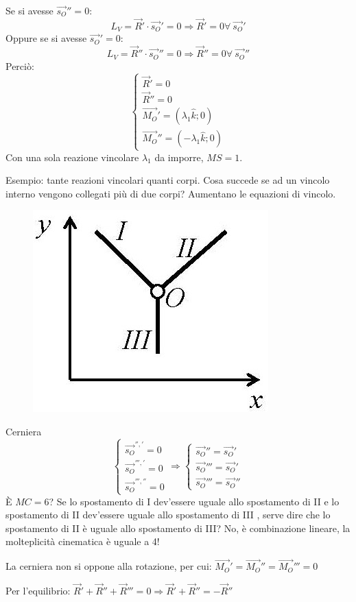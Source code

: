 \documentclass{article}
\begin{document}
\begin{adjustwidth}{2in}{}
\begin{enumerate}
Se si avesse $\vec{s_O}'' = 0$:
\[
L_{V} = \vec{R}' \cdot \vec{s_O}' = 0 \Rightarrow \vec{R}' = 0 \forall ~\vec{s_O}'
\]	
Oppure se si avesse  $\vec{s_O}' = 0$:
\[
L_{V} = \vec{R}'' \cdot \vec{s_O}'' = 0 \Rightarrow \vec{R}'' = 0 \forall ~\vec{s_O}''
\]	
Perciò:
\[
\begin{cases}
	\vec{R}' = 0 \\
	\vec{R}'' = 0 \\
	\vec{M_O}'= (\lambda_1 \hat{k}; 0) \\
	\vec{M_O}'' = (-\lambda_1 \hat{k}; 0)
\end{cases}
\]
Con una sola reazione vincolare $\lambda_1$ da imporre, $MS = 1$.		
		\end{enumerate} 
	\newpage
Esempio: tante reazioni vincolari quanti corpi.\newline
Cosa succede se ad un vincolo interno vengono collegati più di due corpi? Aumentano le equazioni di vincolo.
	\begin{figure}[H]
	\centering
	\includegraphics[width=0.25\linewidth]{immagini/1.PARTE2_Pagina_16}
\end{figure}
Cerniera
\[ 
\begin{cases}
\vec{s_O}^{'', '} = 0 \\
\vec{s_O}^{''', '} = 0 \\
\vec{s_O}^{''', ''} = 0
\end{cases} \Rightarrow \begin{cases}
\vec{s_O}'' = \vec{s_O}' \\
\vec{s_O}''' = \vec{s_O}' \\
\vec{s_O}''' = \vec{s_O}''
\end{cases}
\]
 È $MC=6$? Se lo spostamento di I dev'essere uguale allo spostamento di II e lo spostamento di II dev'essere uguale allo spostamento di III , serve dire che lo spostamento di II è uguale allo spostamento di III? No, è combinazione lineare, la molteplicità cinematica è uguale a 4!
 
 La cerniera non si oppone alla rotazione, per cui: $\vec{M_O}' = \vec{M_O}'' = \vec{M_O}''' = 0$ 
 
 Per l'equilibrio: $ \vec{R}' + \vec{R}'' + \vec{R}''' = 0 \Rightarrow \vec{R}' + \vec{R}'' = - \vec{R}''$ 
 

\end{adjustwidth}
\end{document}
